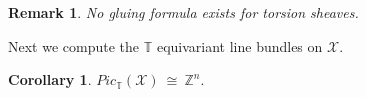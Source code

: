 \documentclass[10pt]{amsart}
\newtheorem{cor}[prop]{Corollary}
\newtheorem{rmk}[prop]{Remark}
\newcommand{\sX}{{\mathcal X}}
\numberwithin{equation}{subsection}
\begin{document}
\begin{rmk} No gluing formula exists for torsion sheaves.    
\end{rmk}
Next we compute the $\mathbb{T}$ equivariant line bundles on $\sX.$
\begin{cor}\label{LB}
$Pic_{\mathbb{T}}(\sX)\ \cong\ \mathbb{Z}^{n}.$
\end{cor}
\end{document}
